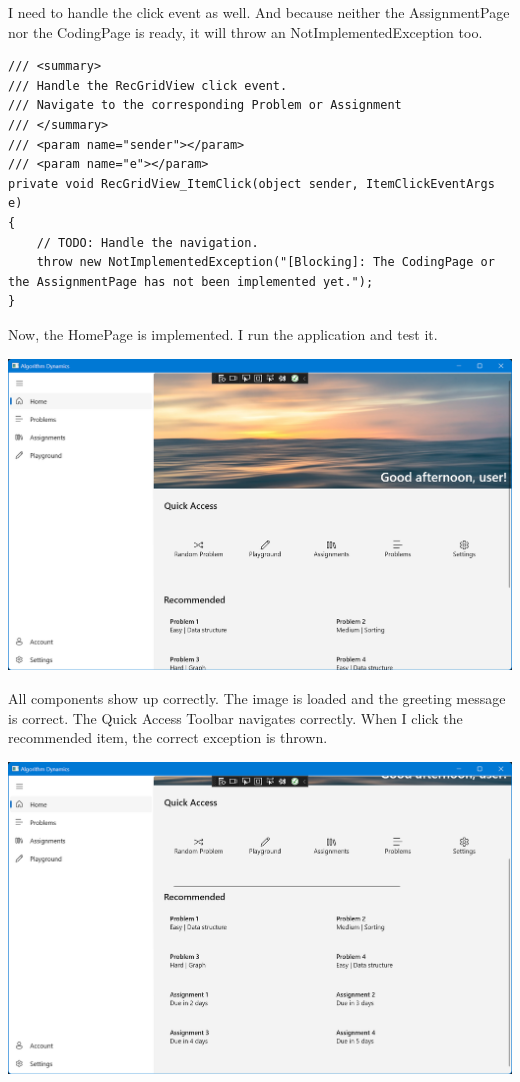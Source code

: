 \documentclass[a4paper]{report}
\begin{document}
I need to handle the click event as well. And because neither the AssignmentPage nor the CodingPage is ready, it will throw an NotImplementedException too.

\begin{verbatim}
/// <summary>
/// Handle the RecGridView click event.
/// Navigate to the corresponding Problem or Assignment
/// </summary>
/// <param name="sender"></param>
/// <param name="e"></param>
private void RecGridView_ItemClick(object sender, ItemClickEventArgs e)
{
    // TODO: Handle the navigation.
    throw new NotImplementedException("[Blocking]: The CodingPage or the AssignmentPage has not been implemented yet.");
}
\end{verbatim}

Now, the HomePage is implemented. I run the application and test it.

\includegraphics[width=\textwidth, height=\textheight, keepaspectratio]{HomePage-Finished}

All components show up correctly. The image is loaded and the greeting message is correct. The Quick Access Toolbar navigates correctly. When I click the recommended item, the correct exception is thrown.

\includegraphics[width=\textwidth, height=\textheight, keepaspectratio]{HomePage-Finished-Scroll}
\end{document}
